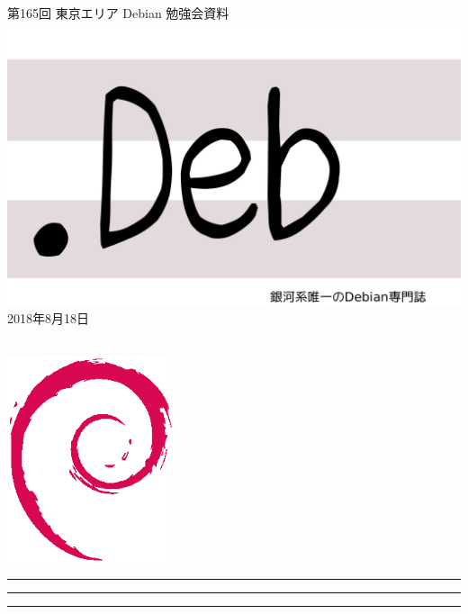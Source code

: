 \documentclass[mingoth,a4paper]{jsarticle}
\newcommand{\debmtgyear}{2018}
\newcommand{\debmtgmonth}{8}
\newcommand{\debmtgdate}{18}
\newcommand{\debmtgnumber}{165}
\begin{document}
\begin{titlepage}
\thispagestyle{empty}

\vspace*{-2cm}
第\debmtgnumber{}回 東京エリア Debian 勉強会資料\\
\hspace*{-2cm}
\includegraphics{image2012-natsu/dotdeb.pdf}\\
\hfill{}\debmtgyear{}年\debmtgmonth{}月\debmtgdate{}日

\\

\vspace*{-2cm}
\hfill{}\includegraphics[height=6cm]{image200502/openlogo-nd.eps}
\end{titlepage}

\newpage

\begin{minipage}[b]{0.2\hsize}
 \colorbox{titleback}{}
\end{minipage}
\begin{minipage}[b]{0.8\hsize}
\hrule
\vspace{2mm}
\hrule
\begin{multicols}{2}
\tableofcontents
\end{multicols}
\vspace{2mm}
\hrule
\end{minipage}
\end{document}

